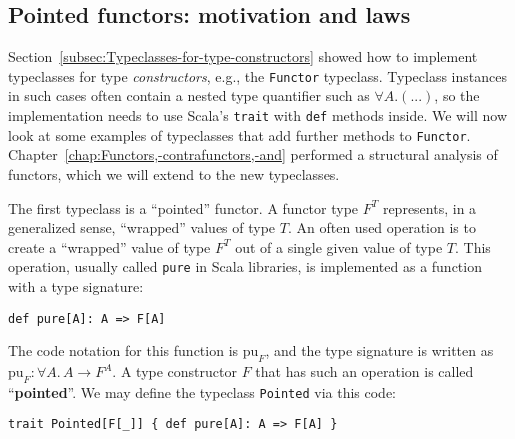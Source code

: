 \subsection{Pointed functors: motivation and laws\label{subsec:Pointed-functors-motivation-equivalence}}

Section~\ref{subsec:Typeclasses-for-type-constructors} showed how
to implement typeclasses for type \emph{constructors}, e.g., the \lstinline!Functor!
typeclass. Typeclass instances in such cases often contain a nested
type quantifier such as $\forall A.\left(...\right)$, so the implementation
needs to use Scala\textsf{'}s \lstinline!trait! with \lstinline!def! methods
inside. We will now look at some examples of typeclasses that add
further methods to \lstinline!Functor!. Chapter~\ref{chap:Functors,-contrafunctors,-and}
performed a structural analysis of functors, which we will extend
to the new typeclasses.

The first typeclass is a \textsf{``}pointed\textsf{''} functor. A functor type $F^{T}$
represents, in a generalized sense, \textsf{``}wrapped\textsf{''} values of type $T$.
An often used operation is to create a \textsf{``}wrapped\textsf{''} value of type
$F^{T}$ out of a single given value of type $T$. This operation,
usually called \lstinline!pure! in Scala libraries, is implemented
as a function with a type signature:
\begin{lstlisting}
def pure[A]: A => F[A]
\end{lstlisting}
The code notation for this function is $\text{pu}_{F}$, and the type
signature is written as $\text{pu}_{F}:\forall A.\,A\rightarrow F^{A}$.
A type constructor $F$ that has such an operation is called \textsf{``}\textbf{pointed}\textsf{''}.
We may define the typeclass
\lstinline!Pointed! via this code:
\begin{lstlisting}
trait Pointed[F[_]] { def pure[A]: A => F[A] }
\end{lstlisting}


